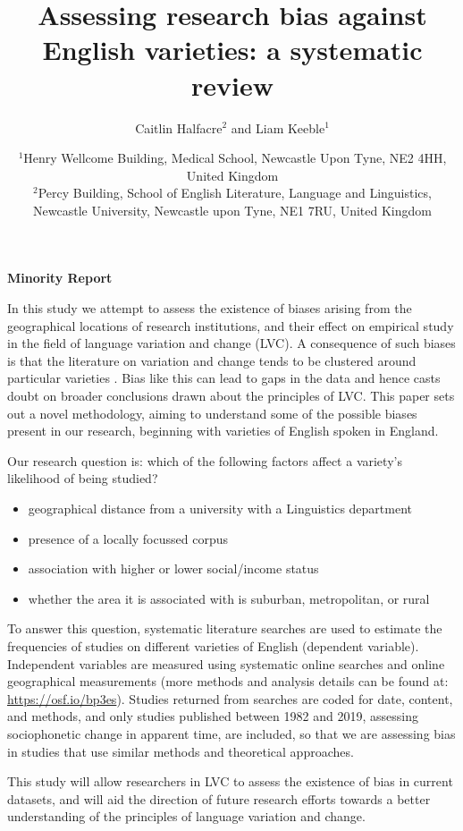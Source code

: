 \documentclass[12pt,a4paper]{article}
\title{Assessing research bias against English varieties: a systematic review}
\author{Caitlin Halfacre$^{2}$ and Liam Keeble$^{1}$}
\date{$^{1}$Henry Wellcome Building, Medical School, Newcastle Upon Tyne, NE2 4HH, United Kingdom\\
$^{2}$Percy Building, School of English Literature, Language and Linguistics, Newcastle University, Newcastle upon Tyne, NE1 7RU, United Kingdom\\}
\begin{document}
\begin{center}
	\textbf{Minority Report}\\
\end{center}


In this study we attempt to assess the existence of biases arising from the geographical locations of research institutions, and their effect on empirical study in the field of language variation and change (LVC).  
A consequence of such biases is that the literature on variation and change tends to be clustered around particular varieties \citep{Trudgill2002}. Bias like this can lead to gaps in the data and hence casts doubt on broader conclusions drawn about the principles of LVC. This paper sets out a novel methodology, aiming to understand some of the possible biases present in our research, beginning with varieties of English spoken in England. 
	
Our research question is: which of the following factors affect a variety's likelihood of being studied?
	\begin{itemize}
		\item geographical distance from a university with a Linguistics department
		\item presence of a locally focussed corpus
		\item association with higher or lower social/income status
		\item whether the area it is associated with is suburban, metropolitan, or rural
	\end{itemize}


To answer this question, systematic literature searches \citep{lefebvre2019searching} are used to estimate the frequencies of studies on different varieties of English (dependent variable). Independent variables are measured using systematic online searches and online geographical measurements (more methods and analysis details can be found at: \url{ https://osf.io/bp3es}). Studies returned from searches are coded for date, content, and methods, and only studies published between 1982 \citep{Wells1982b} and 2019, assessing sociophonetic change in apparent time, are included, so that we are assessing bias in studies that use similar methods and theoretical approaches.

This study will allow researchers in LVC to assess the existence of bias in current datasets, and will aid the direction of future research efforts towards a better understanding of the principles of language variation and change. 

\pagebreak

\end{document}
